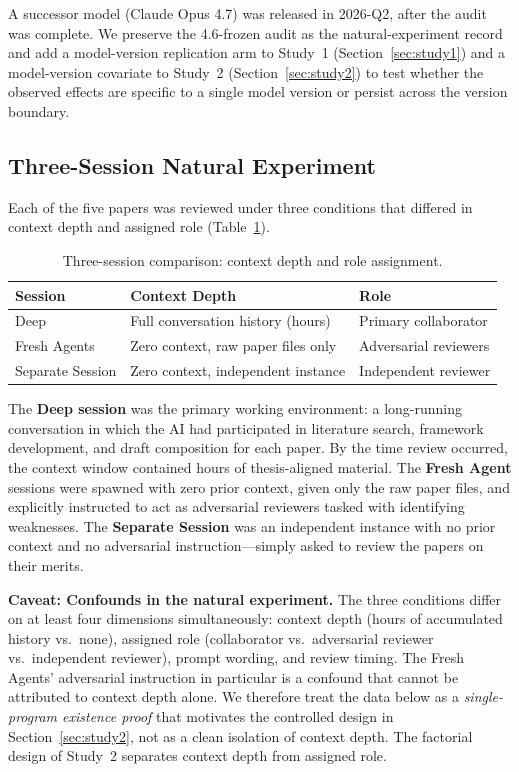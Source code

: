 \documentclass[12pt]{article}
\begin{document}
A successor model (Claude Opus 4.7) was released in 2026-Q2, after the audit was complete. We preserve the 4.6-frozen audit as the natural-experiment record and add a model-version replication arm to Study~1 (Section~\ref{sec:study1}) and a model-version covariate to Study~2 (Section~\ref{sec:study2}) to test whether the observed effects are specific to a single model version or persist across the version boundary.

\subsection{Three-Session Natural Experiment}
\label{sec:three-session}

Each of the five papers was reviewed under three conditions that differed in context depth and assigned role (Table~\ref{tab:sessions}).

\begin{table}[htbp]
\centering
\caption{Three-session comparison: context depth and role assignment.}
\label{tab:sessions}
\begin{tabular}{lll}
\toprule
Session & Context Depth & Role \\
\midrule
Deep & Full conversation history (hours) & Primary collaborator \\
Fresh Agents & Zero context, raw paper files only & Adversarial reviewers \\
Separate Session & Zero context, independent instance & Independent reviewer \\
\bottomrule
\end{tabular}
\end{table}

The \textbf{Deep session} was the primary working environment: a long-running conversation in which the AI had participated in literature search, framework development, and draft composition for each paper. By the time review occurred, the context window contained hours of thesis-aligned material. The \textbf{Fresh Agent} sessions were spawned with zero prior context, given only the raw paper files, and explicitly instructed to act as adversarial reviewers tasked with identifying weaknesses. The \textbf{Separate Session} was an independent instance with no prior context and no adversarial instruction---simply asked to review the papers on their merits.

\textbf{Caveat: Confounds in the natural experiment.} The three conditions differ on at least four dimensions simultaneously: context depth (hours of accumulated history vs.\ none), assigned role (collaborator vs.\ adversarial reviewer vs.\ independent reviewer), prompt wording, and review timing. The Fresh Agents' adversarial instruction in particular is a confound that cannot be attributed to context depth alone. We therefore treat the data below as a \emph{single-program existence proof} that motivates the controlled design in Section~\ref{sec:study2}, not as a clean isolation of context depth. The factorial design of Study~2 separates context depth from assigned role.
\end{document}

